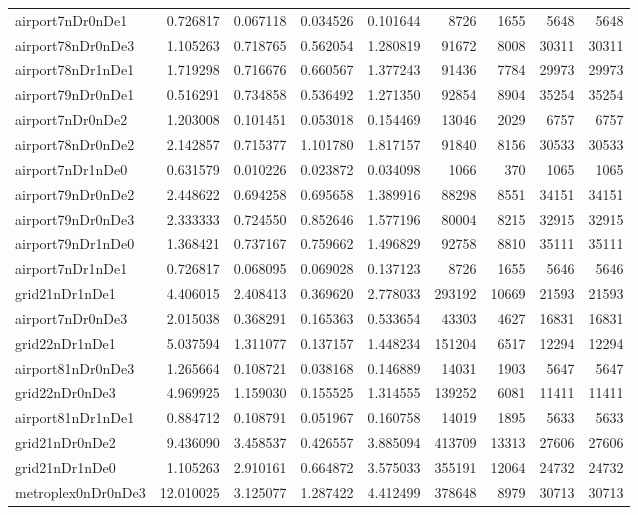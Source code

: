 \begin{longtable}{|l|r|r|r|r|r|r|r|r|}
airport7nDr0nDe1 & 0.726817 & 0.067118 & 0.034526 & 0.101644 & 8726 & 1655 & 5648 & 5648 \\
airport78nDr0nDe3 & 1.105263 & 0.718765 & 0.562054 & 1.280819 & 91672 & 8008 & 30311 & 30311 \\
airport78nDr1nDe1 & 1.719298 & 0.716676 & 0.660567 & 1.377243 & 91436 & 7784 & 29973 & 29973 \\
airport79nDr0nDe1 & 0.516291 & 0.734858 & 0.536492 & 1.271350 & 92854 & 8904 & 35254 & 35254 \\
airport7nDr0nDe2 & 1.203008 & 0.101451 & 0.053018 & 0.154469 & 13046 & 2029 & 6757 & 6757 \\
airport78nDr0nDe2 & 2.142857 & 0.715377 & 1.101780 & 1.817157 & 91840 & 8156 & 30533 & 30533 \\
airport7nDr1nDe0 & 0.631579 & 0.010226 & 0.023872 & 0.034098 & 1066 & 370 & 1065 & 1065 \\
airport79nDr0nDe2 & 2.448622 & 0.694258 & 0.695658 & 1.389916 & 88298 & 8551 & 34151 & 34151 \\
airport79nDr0nDe3 & 2.333333 & 0.724550 & 0.852646 & 1.577196 & 80004 & 8215 & 32915 & 32915 \\
airport79nDr1nDe0 & 1.368421 & 0.737167 & 0.759662 & 1.496829 & 92758 & 8810 & 35111 & 35111 \\
airport7nDr1nDe1 & 0.726817 & 0.068095 & 0.069028 & 0.137123 & 8726 & 1655 & 5646 & 5646 \\
grid21nDr1nDe1 & 4.406015 & 2.408413 & 0.369620 & 2.778033 & 293192 & 10669 & 21593 & 21593 \\
airport7nDr0nDe3 & 2.015038 & 0.368291 & 0.165363 & 0.533654 & 43303 & 4627 & 16831 & 16831 \\
grid22nDr1nDe1 & 5.037594 & 1.311077 & 0.137157 & 1.448234 & 151204 & 6517 & 12294 & 12294 \\
airport81nDr0nDe3 & 1.265664 & 0.108721 & 0.038168 & 0.146889 & 14031 & 1903 & 5647 & 5647 \\
grid22nDr0nDe3 & 4.969925 & 1.159030 & 0.155525 & 1.314555 & 139252 & 6081 & 11411 & 11411 \\
airport81nDr1nDe1 & 0.884712 & 0.108791 & 0.051967 & 0.160758 & 14019 & 1895 & 5633 & 5633 \\
grid21nDr0nDe2 & 9.436090 & 3.458537 & 0.426557 & 3.885094 & 413709 & 13313 & 27606 & 27606 \\
grid21nDr1nDe0 & 1.105263 & 2.910161 & 0.664872 & 3.575033 & 355191 & 12064 & 24732 & 24732 \\
metroplex0nDr0nDe3 & 12.010025 & 3.125077 & 1.287422 & 4.412499 & 378648 & 8979 & 30713 & 30713 \\

\end{longtable}
